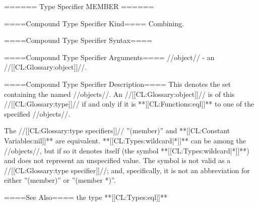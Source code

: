 ====== Type Specifier MEMBER ======

====Compound Type Specifier Kind====
Combining.

====Compound Type Specifier Syntax====

====Compound Type Specifier Arguments====
//object// - an //[[CL:Glossary:object]]//.

====Compound Type Specifier Description====
This denotes the set containing the named //objects//. An //[[CL:Glossary:object]]// is of this //[[CL:Glossary:type]]// if and only if it is **[[CL:Functions:eql]]** to one of the specified //objects//.

The //[[CL:Glossary:type specifiers]]// ''(member)'' and **[[CL:Constant Variables:nil]]** are equivalent. **[[CL:Types:wildcard|*]]** can be among the //objects//, but if so it denotes itself (the symbol **[[CL:Types:wildcard|*]]**) and does not represent an unspecified value. The symbol  is not valid as a //[[CL:Glossary:type specifier]]//; and, specifically, it is not an abbreviation for either ''(member)'' or ''(member *)''.

====See Also====
the type **[[CL:Types:eql]]**

